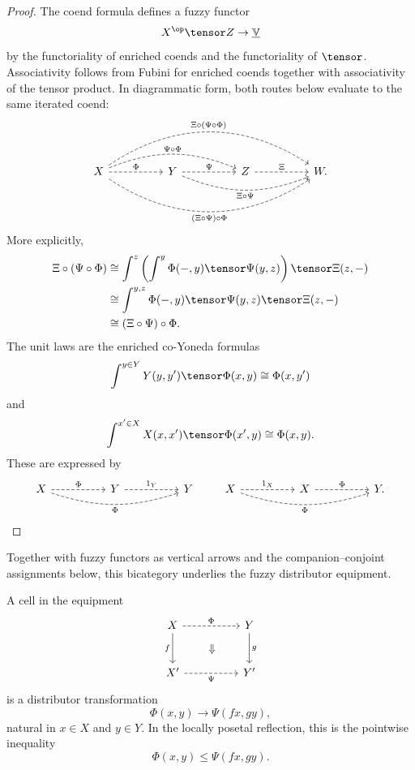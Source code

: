 \begin{proof}
The coend formula defines a fuzzy functor
\[
    X^{\op}\tensor Z\to \underline{\mathbb V}
\]
by the functoriality of enriched coends and the functoriality of \(\tensor\).
Associativity follows from Fubini for enriched coends together with associativity
of the tensor product. In diagrammatic form, both routes below evaluate to the
same iterated coend:
\[
\begin{tikzcd}[column sep=huge,row sep=large]
X
    \ar[r,dashed,"\Phi"]
    \ar[rr,bend left=22,dashed,"\Psi\circ\Phi"]
    \ar[rrr,bend right=34,dashed,"{(\Xi\circ\Psi)\circ\Phi}"']
    \ar[rrr,bend left=34,dashed,"{\Xi\circ(\Psi\circ\Phi)}"]
&
Y
    \ar[r,dashed,"\Psi"]
    \ar[rr,bend right=22,swap,dashed,"\Xi\circ\Psi"]
&
Z
    \ar[r,dashed,"\Xi"]
&
W.
\end{tikzcd}
\]
More explicitly,
\[
\begin{aligned}
    \Xi\circ(\Psi\circ\Phi)
    &\cong
    \int^{z}
    \left(
        \int^{y}\Phi(-,y)\tensor\Psi(y,z)
    \right)
    \tensor \Xi(z,-)
\\
    &\cong
    \int^{y,z}
        \Phi(-,y)\tensor\Psi(y,z)\tensor\Xi(z,-)
\\
    &\cong
    (\Xi\circ\Psi)\circ\Phi.
\end{aligned}
\]
The unit laws are the enriched co-Yoneda formulas
\[
    \int^{y\in Y}
        Y(y,y')\tensor \Phi(x,y)
    \cong
    \Phi(x,y')
\]
and
\[
    \int^{x'\in X}
        X(x,x')\tensor \Phi(x',y)
    \cong
    \Phi(x,y).
\]
These are expressed by
\[
\begin{tikzcd}[column sep=huge,row sep=large]
X
    \ar[r,dashed,"\Phi"]
    \ar[rr,bend right=18,dashed,"\Phi"']
&
Y
    \ar[r,dashed,"1_Y"]
&
Y
\end{tikzcd}
\qquad
\begin{tikzcd}[column sep=huge,row sep=large]
X
    \ar[r,dashed,"1_X"]
    \ar[rr,bend right=18,dashed,"\Phi"']
&
X
    \ar[r,dashed,"\Phi"]
&
Y.
\end{tikzcd}
\]
\end{proof}

Together with fuzzy functors as vertical arrows and the companion--conjoint
assignments below, this bicategory underlies the fuzzy distributor equipment.

A cell in the equipment
\[
\begin{tikzcd}[column sep=huge,row sep=large]
X
    \ar[d,"f"']
    \ar[r,dashed,"\Phi"]
&
Y
    \ar[d,"g"]
\\
X'
    \ar[r,dashed,"\Psi"']
&
Y'
\ar[phantom,from=1-2,to=2-1,"\Downarrow" description]
\end{tikzcd}
\]
is a distributor transformation
\[
    \Phi(x,y)\to \Psi(fx,gy),
\]
natural in \(x\in X\) and \(y\in Y\). In the locally posetal reflection, this is
the pointwise inequality
\[
    \Phi(x,y)\leq \Psi(fx,gy).
\]

